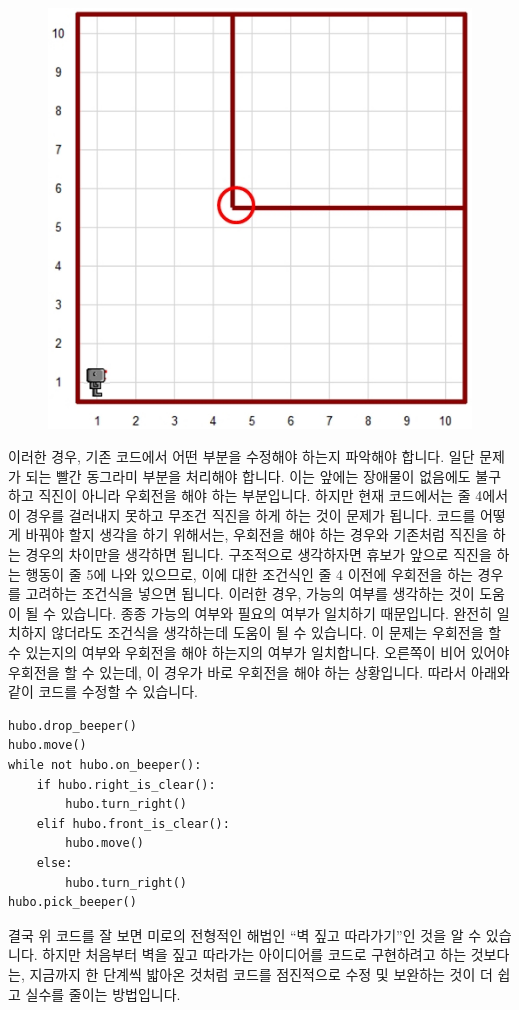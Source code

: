 \documentclass[../main.tex]{subfiles}
\begin{document}
\begin{figure}[H]
\centering
\includegraphics[width=0.5\linewidth]{"./lectures/lecture7_exception"}
\label{fig:lecture7exception}
\end{figure}

이러한 경우, 기존 코드에서 어떤 부분을 수정해야 하는지 파악해야 합니다.
일단 문제가 되는 빨간 동그라미 부분을 처리해야 합니다.
이는 앞에는 장애물이 없음에도 불구하고 직진이 아니라 우회전을 해야 하는 부분입니다.
하지만 현재 코드에서는 줄 4에서 이 경우를 걸러내지 못하고 무조건 직진을 하게 하는 것이 문제가 됩니다.
코드를 어떻게 바꿔야 할지 생각을 하기 위해서는, 우회전을 해야 하는 경우와 기존처럼 직진을 하는 경우의 차이만을 생각하면 됩니다.
구조적으로 생각하자면 휴보가 앞으로 직진을 하는 행동이 줄 5에 나와 있으므로, 이에 대한 조건식인 줄 4 이전에 우회전을 하는 경우를 고려하는 조건식을 넣으면 됩니다.
이러한 경우, 가능의 여부를 생각하는 것이 도움이 될 수 있습니다.
종종 가능의 여부와 필요의 여부가 일치하기 때문입니다.
완전히 일치하지 않더라도 조건식을 생각하는데 도움이 될 수 있습니다.
이 문제는 우회전을 할 수 있는지의 여부와 우회전을 해야 하는지의 여부가 일치합니다.
오른쪽이 비어 있어야 우회전을 할 수 있는데, 이 경우가 바로 우회전을 해야 하는 상황입니다.
따라서 아래와 같이 코드를 수정할 수 있습니다.

\begin{verbatim}
hubo.drop_beeper()
hubo.move()
while not hubo.on_beeper():
	if hubo.right_is_clear():
		hubo.turn_right()
	elif hubo.front_is_clear():
		hubo.move()
	else:
		hubo.turn_right()
hubo.pick_beeper()
\end{verbatim}

결국 위 코드를 잘 보면 미로의 전형적인 해법인 ``벽 짚고 따라가기''인 것을 알 수 있습니다.
하지만 처음부터 벽을 짚고 따라가는 아이디어를 코드로 구현하려고 하는 것보다는, 지금까지 한 단계씩 밟아온 것처럼 코드를 점진적으로 수정 및 보완하는 것이 더 쉽고 실수를 줄이는 방법입니다.
\end{document}
